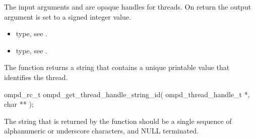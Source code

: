 
%

\argdesc
The input arguments  and  are opaque handles for threads.
On return the output argument  is set to a signed integer value.

\crossreferences
\begin{itemize}
  \item {} type, see .
	\item {} type, see .
\end{itemize}

\label{subsubsubsec:ompd_get_thread_handle_string_id}
\summary
The  function returns a string
that contains a unique printable value that identifies the thread.

\format

\begin{cspecific}
\begin{ompSyntax}
ompd_rc_t ompd_get_thread_handle_string_id(
  ompd_thread_handle_t *,
  char **
);
\end{ompSyntax}
\end{cspecific}


\descr
The string that is returned by the function should be a single sequence of alphanumeric or
underscore characters, and NULL terminated.

